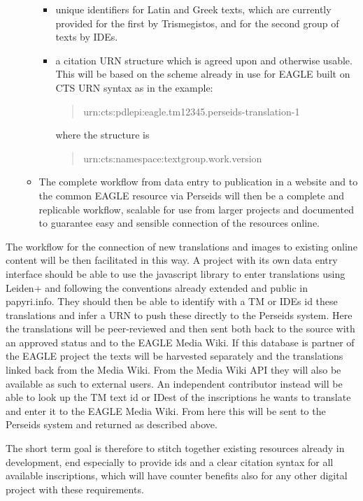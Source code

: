 \documentclass[amsthm,ebook]{saparticle}
\begin{document}
\begin{itemize}
\begin{itemize}
	\begin{itemize}
	\item unique identifiers for Latin and Greek texts, which are currently provided for the first by Trismegistos, and for the second group of texts by IDEs.
	\item a citation URN structure which is agreed upon and otherwise usable. This will be based on the scheme already in use for EAGLE built on CTS URN syntax as in the example: 
	\begin{quotation}
\footnotesize{urn:cts:pdlepi:eagle.tm12345.perseids-translation-1}
\end{quotation}
where the structure is 
\begin{quotation}
\footnotesize{urn:cts:namespace:textgroup.work.version}
\end{quotation}
	\end{itemize}
	\item The complete workflow from data entry to publication in a website and to the common EAGLE resource via Perseids will then be a complete and replicable workflow, scalable for use from larger projects and documented to guarantee easy and sensible connection of the resources online. 
	 \end{itemize}
\end{itemize}

The workflow for the connection of new translations and images to existing online content will be then facilitated in this way. 
A project with its own data entry interface should be able to use the javascript library to enter translations using Leiden+ and following the conventions already extended and public in papyri.info. They should then be able to identify with a TM or IDEs id these translations and infer a URN to push these directly to the Perseids system. Here the translations will be peer-reviewed and then sent both back to the source with an approved status and to the EAGLE Media Wiki. If this database is partner of the  EAGLE project the texts will be harvested separately and the translations linked back from the Media Wiki. From the Media Wiki API they will also be available as such to external users. 
An independent contributor instead will be able to look up the TM text id or IDest of the inscriptions he wants to translate and enter it to the EAGLE Media Wiki. From here this will be sent to the Perseids system and returned as described above. 


The short term goal is therefore to stitch together existing resources already in development, end especially to provide ids and a clear citation syntax for all available inscriptions, which will have counter benefits also for any other digital project with these requirements. 
\end{document}

